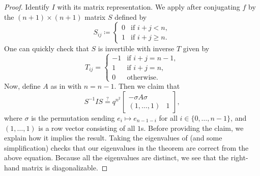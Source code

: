 \begin{proof}
    Identify $I$ with its matrix representation. We apply  after conjugating $f$ by the $(n+1)\times(n+1)$ matrix $S$ defined by
    \[S_{ij}\coloneqq\begin{cases}
        0 & \text{if }i+j<n, \\
        1 & \text{if }i+j\ge n.
    \end{cases}\]
    One can quickly check that $S$ is invertible with inverse $T$ given by
    \[T_{ij}=\begin{cases}
        -1 & \text{if }i+j=n-1, \\
        1 & \text{if }i+j=n, \\
        0 & \text{otherwise}.
    \end{cases}\]
    Now, define $A$ as in  with $n=n-1$. Then we claim that
    \begin{equation}
        S^{-1}IS \stackrel?= q^{n^2}\begin{bmatrix}
            -\sigma A\sigma \\
            (1,\ldots,1) & 1
        \end{bmatrix}, \label{eq:conj-intertwining-gl}
    \end{equation}
    where $\sigma$ is the permutation sending $e_i\mapsto e_{n-1-i}$ for all $i\in\{0,\ldots,n-1\}$, and $(1,\ldots,1)$ is a row vector consisting of all $1$s. Before providing the claim, we explain how it implies the result. Taking the eigenvalues of  (and some simplification) checks that our eigenvalues in the theorem are correct from the above equation. Because all the eigenvalues are distinct, we see that the right-hand matrix is diagonalizable.


\end{proof}
